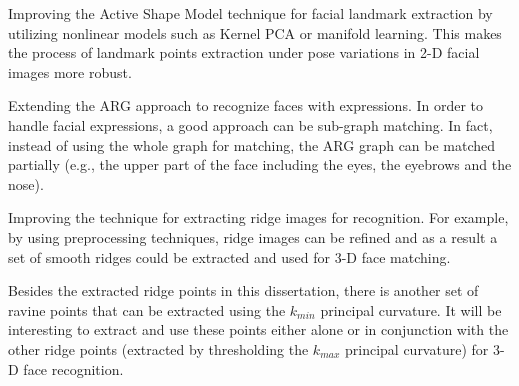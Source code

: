 \item
Improving the Active Shape Model technique for facial landmark
extraction by utilizing nonlinear models such as Kernel PCA or
manifold learning. This makes the process of landmark points
extraction under pose variations in 2-D facial images more robust.

\item
Extending the ARG approach to recognize faces with expressions. In
order to handle facial expressions, a good approach can be sub-graph
matching. In fact, instead of using the whole graph for matching,
the ARG graph can be matched partially (e.g., the upper part of the
face including the eyes, the eyebrows and the nose).

\item
Improving the technique for extracting ridge images for recognition.
For example, by using preprocessing techniques, ridge images can be
refined and as a result a set of smooth ridges could be extracted
and used for 3-D face matching.

\item
Besides the extracted ridge points in this dissertation, there is
another set of ravine points that can be extracted using the
$k_{min}$ principal curvature. It will be interesting to extract and
use these points either alone or in conjunction with the other ridge
points (extracted by thresholding the $k_{max}$ principal curvature)
for 3-D face recognition. \ei
